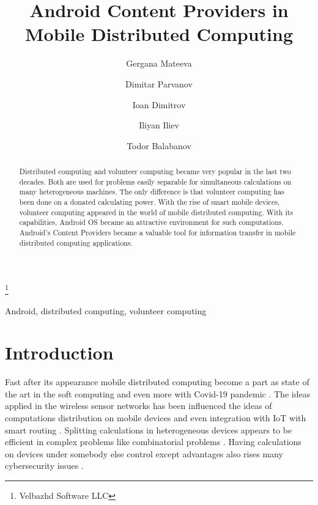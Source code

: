 \documentclass{ifacconf}
\begin{document}
\begin{frontmatter}

\title{Android Content Providers in Mobile Distributed Computing } 

\thanks[footnoteinfo]{Velbazhd Software LLC}

\author[First]{Gergana Mateeva} 
\author[First]{Dimitar Parvanov} 
\author[Second]{Ioan Dimitrov} 
\author[First]{Iliyan Iliev}
\author[First]{Todor Balabanov} 

\address[First]{Bulgarian Academy of Sciences\\Institute of Information and Communication Technologies\\acad. Georgi Bonchev Str., block 2, 1113 Sofia, Bulgaria\\(gergana.mateeva, dimitar.parvanov, iliyan.iliev, todor.balabanov) @iict.bas.bg}
\address[Second]{Technical University of Sofia\\Faculty of Electronic Engineering and Technology\\8 St. Kliment Ohridski Blvd., block 1, 1756 Sofia, Bulgaria\\joancdimitrov@tu-sofia.bg}

\begin{abstract}
Distributed computing and volunteer computing became very popular in the last two decades. Both are used for problems easily separable for simultaneous calculations on many heterogeneous machines. The only difference is that volunteer computing has been done on a donated calculating power. With the rise of smart mobile devices, volunteer computing appeared in the world of mobile distributed computing. With its capabilities, Android OS became an attractive environment for such computations. Android's Content Providers became a valuable tool for information transfer in mobile distributed computing applications. 
\end{abstract}

\begin{keyword}
Android, distributed computing, volunteer computing
\end{keyword}

\end{frontmatter}

\section{Introduction}

Fast after its appearance mobile distributed computing become a part as state of the art in the soft computing \cite{Angelova-2009-a} and even more with Covid-19 pandemic \cite{Petrov-2021-a}. The ideas applied in the wireless sensor networks \cite{Alexandrov-2016-a} has been influenced the ideas of computations distribution on mobile devices and even integration with IoT \cite{Dineva-2019-a} with smart routing \cite{Tashev-2019-a}. Splitting calculations in heterogeneous devices appears to be efficient in complex problems like combinatorial problems \cite{Borissova-2015-a}. Having calculations on devices under somebody else control \cite{Balabanov-2020-a} except advantages also rises many cybersecurity issues \cite{Dimitrov-2021-a}.
\end{document}
